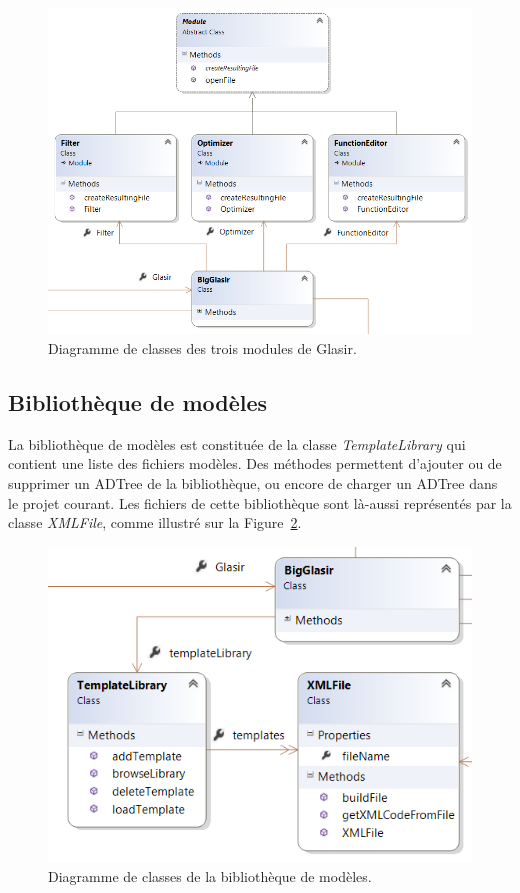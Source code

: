     	
    	\begin{figure}[H]
	        \centering
	        \includegraphics[height=0.7\textwidth]{figure/modules.png}
	        \caption{Diagramme de classes des trois modules de Glasir.}
	        \label{fig:mod}
	    \end{figure}
	    
	    
	\subsection{Bibliothèque de modèles}
    	\label{sec:diagClassBib}
    	La bibliothèque de modèles est constituée de la classe \emph{TemplateLibrary} qui contient une liste des fichiers modèles. Des méthodes permettent d'ajouter ou de supprimer un ADTree de la bibliothèque, ou encore de charger un ADTree dans le projet courant. Les fichiers de cette bibliothèque sont là-aussi représentés par la classe \emph{XMLFile}, comme illustré sur la {\sc Figure}~\ref{fig:lib}.
    	
    	\begin{figure}[H]
	        \centering
	        \includegraphics[height=0.5\textwidth]{figure/library.png}
	        \caption{Diagramme de classes de la bibliothèque de modèles.}
	        \label{fig:lib}
	    \end{figure}